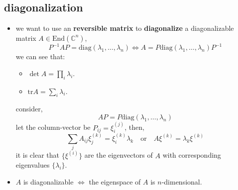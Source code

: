 \subsection{diagonalization}
\begin{itemize}
	\item we want to use an \textbf{reversible matrix} to \textbf{diagonalize} a diagonalizable matrix $A \in \mathrm{End}(\mathbb{C}^n)$,
	\begin{equation}
		P^{- 1} A P = \mathrm{diag}(\lambda_1, \dots, \lambda_n) \iff A = P \mathrm{diag}(\lambda_1, \dots, \lambda_n) P^{- 1}
	\end{equation}
	we can see that:
	\begin{itemize}
		\item $\det A = \prod_i \lambda_i$.
		
		\item $\mathrm{tr} A = \sum_i \lambda_i$.
	\end{itemize}
	
	\begin{tcolorbox}[title=method to find $P$:]
		consider,
		\begin{equation}
			A P = P \mathrm{diag}(\lambda_1, \dots, \lambda_n)
		\end{equation}
		let the column-vector be $P_{i j} = \xi^{(j)}_i$, then,
		\begin{equation}
			\sum_j A_{i j} \xi^{(k)}_j = \xi^{(k)}_i \lambda_k \quad \text{or} \quad A \xi^{(k)} = \lambda_k \xi^{(k)}
		\end{equation}
		it is clear that $\{\xi^{(i)}\}$ are the eigenvectors of $A$ with corresponding eigenvalues $\{\lambda_i\}$.
	\end{tcolorbox}
	
	\item $A$ is diagonalizable $\iff$ the eigenspace of $A$ is $n$-dimensional.
\end{itemize}

